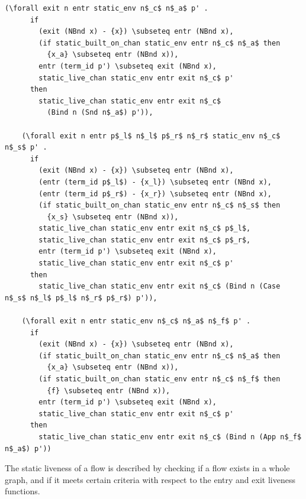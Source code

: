 \documentclass[10pt]{article}
\begin{document}
\begin{lstlisting}[language=logic, mathescape]
    (\forall exit n entr static_env n$_c$ n$_a$ p' .
      if 
        (exit (NBnd x) - {x}) \subseteq entr (NBnd x),
        (if static_built_on_chan static_env entr n$_c$ n$_a$ then
          {x_a} \subseteq entr (NBnd x)),
        entr (term_id p') \subseteq exit (NBnd x),
        static_live_chan static_env entr exit n$_c$ p'
      then
        static_live_chan static_env entr exit n$_c$
          (Bind n (Snd n$_a$) p')),

    (\forall exit n entr p$_l$ n$_l$ p$_r$ n$_r$ static_env n$_c$ n$_s$ p' .
      if 
        (exit (NBnd x) - {x}) \subseteq entr (NBnd x),
        (entr (term_id p$_l$) - {x_l}) \subseteq entr (NBnd x),
        (entr (term_id p$_r$) - {x_r}) \subseteq entr (NBnd x),
        (if static_built_on_chan static_env entr n$_c$ n$_s$ then
          {x_s} \subseteq entr (NBnd x)),
        static_live_chan static_env entr exit n$_c$ p$_l$,
        static_live_chan static_env entr exit n$_c$ p$_r$,
        entr (term_id p') \subseteq exit (NBnd x),
        static_live_chan static_env entr exit n$_c$ p'
      then 
        static_live_chan static_env entr exit n$_c$ (Bind n (Case n$_s$ n$_l$ p$_l$ n$_r$ p$_r$) p')),

    (\forall exit n entr static_env n$_c$ n$_a$ n$_f$ p' .
      if
        (exit (NBnd x) - {x}) \subseteq entr (NBnd x),
        (if static_built_on_chan static_env entr n$_c$ n$_a$ then
          {x_a} \subseteq entr (NBnd x)),
        (if static_built_on_chan static_env entr n$_c$ n$_f$ then
          {f} \subseteq entr (NBnd x)),
        entr (term_id p') \subseteq exit (NBnd x),
        static_live_chan static_env entr exit n$_c$ p'
      then
        static_live_chan static_env entr exit n$_c$ (Bind n (App n$_f$ n$_a$) p'))
  \end{lstlisting}

The static liveness of a flow is described by checking if a flow exists in a whole
graph, and if it meets certain criteria with respect to the entry and exit liveness
functions. 
\end{document}
